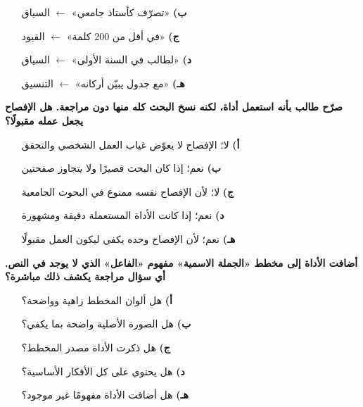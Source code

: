 \documentclass[11pt,a4paper]{article}
\begin{document}
\begin{multicols}{2}
\begin{minipage}{\linewidth}
\begin{itemize}[leftmargin=0.95cm, labelsep=4pt, itemsep=0pt, topsep=2pt, parsep=0pt]
  \item[\textbf{ب)}] «تصرّف كأستاذ جامعي» $\leftarrow$ السياق
  \item[\textbf{ج)}] «في أقل من 200 كلمة» $\leftarrow$ القيود
  \item[\textbf{د)}] «لطالب في السنة الأولى» $\leftarrow$ السياق
  \item[\textbf{هـ)}] «مع جدول يبيّن أركانه» $\leftarrow$ التنسيق
\end{itemize}
\end{minipage}\par\vspace{7pt plus 4pt}
\noindent\begin{minipage}{\linewidth}
\hangindent=0.7cm\textbf{صرّح طالب بأنه استعمل أداة، لكنه نسخ البحث كله منها دون مراجعة. هل الإفصاح يجعل عمله مقبولًا؟}
\begin{itemize}[leftmargin=0.95cm, labelsep=4pt, itemsep=0pt, topsep=2pt, parsep=0pt]
  \item[\textbf{أ)}] لا؛ الإفصاح لا يعوّض غياب العمل الشخصي والتحقق
  \item[\textbf{ب)}] نعم؛ إذا كان البحث قصيرًا ولا يتجاوز صفحتين
  \item[\textbf{ج)}] لا؛ لأن الإفصاح نفسه ممنوع في البحوث الجامعية
  \item[\textbf{د)}] نعم؛ إذا كانت الأداة المستعملة دقيقة ومشهورة
  \item[\textbf{هـ)}] نعم؛ لأن الإفصاح وحده يكفي ليكون العمل مقبولًا
\end{itemize}
\end{minipage}\par\vspace{7pt plus 4pt}
\noindent\begin{minipage}{\linewidth}
\hangindent=0.7cm\textbf{أضافت الأداة إلى مخطط «الجملة الاسمية» مفهوم «الفاعل» الذي لا يوجد في النص. أي سؤال مراجعة يكشف ذلك مباشرة؟}
\begin{itemize}[leftmargin=0.95cm, labelsep=4pt, itemsep=0pt, topsep=2pt, parsep=0pt]
  \item[\textbf{أ)}] هل ألوان المخطط زاهية وواضحة؟
  \item[\textbf{ب)}] هل الصورة الأصلية واضحة بما يكفي؟
  \item[\textbf{ج)}] هل ذكرت الأداة مصدر المخطط؟
  \item[\textbf{د)}] هل يحتوي على كل الأفكار الأساسية؟
  \item[\textbf{هـ)}] هل أضافت الأداة مفهومًا غير موجود؟
\end{itemize}
\end{minipage}\par\vspace{7pt plus 4pt}
\end{multicols}
\end{document}
